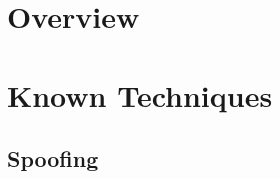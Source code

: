 \documentclass[11pt,fleqn,oneside]{book} %
\begin{document}

\coverpage{\TITLE}{\SUBTITLE}{\AUTHOR}{\DATE}{\SUBJECT}
\newpage
\backgroundbarvisiblefalse



\newpage
\tableofcontents

\part{Overview}



\part{Known Techniques}
\chapter{Spoofing} \label{ch:known-spoofing}


\newpage
\newpage
\end{document}
